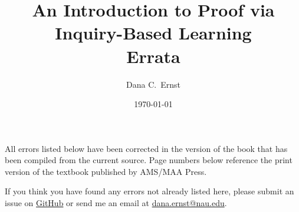 \documentclass[11pt]{article}%
\newcommand{\blankline}{\pagebreak[2]\vspace{.5\baselineskip}}
\begin{document}
\title{An Introduction to Proof via Inquiry-Based Learning\\
Errata}
\author{Dana C.~Ernst}
\date{\today}

\maketitle

All errors listed below have been corrected in the version of the book that has been compiled from the current source.  Page numbers below reference the print version of the textbook published by AMS/MAA Press.

\blankline

If you think you have found any errors not already listed here, please submit an issue on \href{https://github.com/dcernst/IBL-IntroToProof/issues}{GitHub} or send me an email at \url{dana.ernst@nau.edu}.
\end{document}
